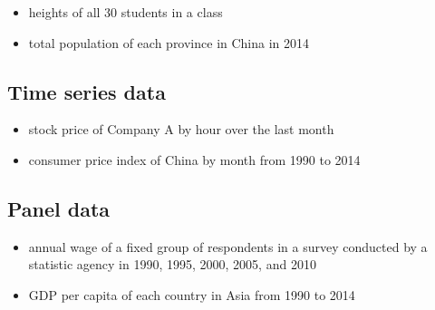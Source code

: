 \documentclass[a4paper,11pt]{article}
\begin{document}
\begin{itemize}
\item heights of all 30 students in a class

\item total population of each province in China in 2014
\end{itemize}

\subsection{Time series data}
\label{sec:org90e2642}

\begin{itemize}
\item stock price of Company A by hour over the last month

\item consumer price index of China by month from 1990 to 2014
\end{itemize}

\subsection{Panel data}
\label{sec:org686247e}

\begin{itemize}
\item annual wage of a fixed group of respondents in a survey conducted by
a statistic agency in 1990, 1995, 2000, 2005, and 2010

\item GDP per capita of each country in Asia from 1990 to 2014
\end{itemize}
\end{document}
